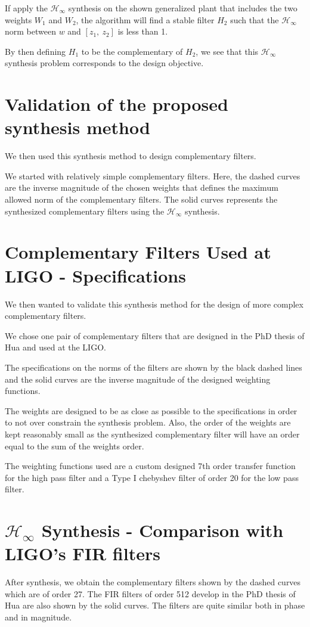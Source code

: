 \documentclass[hangsection=false, titlepage=false, tocnp=false]{cleanreport}
\begin{document}
If apply the \(\mathcal{H}_\infty\) synthesis on the shown generalized plant that includes the two weights \(W_1\) and \(W_2\), the algorithm will find a stable filter \(H_2\) such that the \(\mathcal{H}_\infty\) norm between \(w\) and \([z_1,\ z_2]\) is less than 1.

By then defining \(H_1\) to be the complementary of \(H_2\), we see that this \(\mathcal{H}_\infty\) synthesis problem corresponds to the design objective.

\section{Validation of the proposed synthesis method}
\label{sec:org4885e1d}
We then used this synthesis method to design complementary filters.

We started with relatively simple complementary filters.
Here, the dashed curves are the inverse magnitude of the chosen weights that defines the maximum allowed norm of the complementary filters.
The solid curves represents the synthesized complementary filters using the \(\mathcal{H}_\infty\) synthesis.

\section{Complementary Filters Used at LIGO - Specifications}
\label{sec:org2cb9d01}
We then wanted to validate this synthesis method for the design of more complex complementary filters.

We chose one pair of complementary filters that are designed in the PhD thesis of Hua and used at the LIGO.

The specifications on the norms of the filters are shown by the black dashed lines and the solid curves are the inverse magnitude of the designed weighting functions.

The weights are designed to be as close as possible to the specifications in order to not over constrain the synthesis problem.
Also, the order of the weights are kept reasonably small as the synthesized complementary filter will have an order equal to the sum of the weights order.

The weighting functions used are a custom designed 7th order transfer function for the high pass filter and a Type I chebyshev filter of order 20 for the low pass filter.

\section{\(\mathcal{H}_\infty\) Synthesis - Comparison with LIGO's FIR filters}
\label{sec:org5ec32cc}
After synthesis, we obtain the complementary filters shown by the dashed curves which are of order 27.
The FIR filters of order 512 develop in the PhD thesis of Hua are also shown by the solid curves.
The filters are quite similar both in phase and in magnitude.
\end{document}
